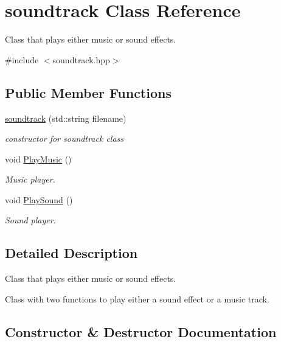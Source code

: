 \hypertarget{classsoundtrack}{}\section{soundtrack Class Reference}
\label{classsoundtrack}


Class that plays either music or sound effects.  




{\ttfamily \#include $<$soundtrack.\+hpp$>$}

\subsection*{Public Member Functions}
\begin{DoxyCompactItemize}
\item 
\hyperlink{classsoundtrack_add31bdeb1a693d541443f1d88586d3b6}{soundtrack} (std\+::string filename)
\begin{DoxyCompactList}\small\item\em constructor for soundtrack class \end{DoxyCompactList}\item 
void \hyperlink{classsoundtrack_a9bc49316f0c8607aef388728d2ca28db}{Play\+Music} ()
\begin{DoxyCompactList}\small\item\em Music player. \end{DoxyCompactList}\item 
void \hyperlink{classsoundtrack_a3c86452d68b41eea981d0df4984713e8}{Play\+Sound} ()
\begin{DoxyCompactList}\small\item\em Sound player. \end{DoxyCompactList}\end{DoxyCompactItemize}


\subsection{Detailed Description}
Class that plays either music or sound effects. 

Class with two functions to play either a sound effect or a music track. 

\subsection{Constructor \& Destructor Documentation}
\mbox{\label{classsoundtrack_add31bdeb1a693d541443f1d88586d3b6}} 
